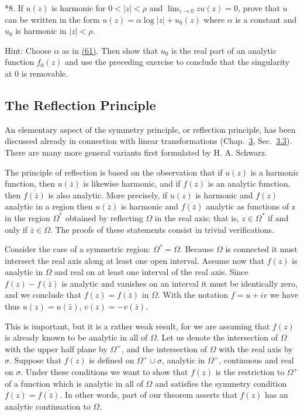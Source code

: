 *8. If $u(z)$ is harmonic for $0 < |z| < \rho$ and $\lim_{z \to 0} zu(z) = 0$, prove that $u$ can be written in the form $u(z) = \alpha \log |z| + u_0(z)$ where $\alpha$ is a constant and $u_0$ is harmonic in $|z| < \rho$.

Hint: Choose $\alpha$ as in \hyperref[eq:4.61]{(61)}. Then show that $u_{0}$ is the real part of an analytic function $f_{0}(z)$ and use the preceding exercise to conclude that the singularity at 0 is removable.

\setcounter{section}{6}\setcounter{subsection}{4}\subsection{The Reflection Principle}\label{sec:4.6.5}
An elementary aspect of the symmetry principle, or reflection principle, has been discussed already in connection with linear transformations (Chap.~\hyperref[chap:3]{3}, Sec.~\hyperref[sec:3.3.3]{3.3}). There are many more general variants first formulated by H. A. Schwarz.

The principle of reflection is based on the observation that if $u(z)$ is a harmonic function, then $u(\bar{z})$ is likewise harmonic, and if $f(z)$ is an analytic function, then $\overline{f(\bar{z})}$ is also analytic. More precisely, if $u(z)$ is harmonic and $f(z)$ analytic in a region then $u(\bar{z})$ is harmonic and $\overline{f(\bar{z})}$ analytic as functions of z in the region $\Omega^{*}$ obtained by reflecting $\Omega$ in the real axis; that is, $z \in \Omega^{*}$ if and only if $\bar{z} \in \Omega$. The proofs of these statements consist in trivial verifications.

Consider the case of a symmetric region: $\Omega^{*} = \Omega$. Because $\Omega$ is connected it must intersect the real axis along at least one open interval. Assume now that $f(z)$ is analytic in $\Omega$ and real on at least one interval of the real axis. Since $f(z) - \overline{f(\bar{z})}$ is analytic and vanishes on an interval it must be identically zero, and we conclude that $f(z) = \overline{f(\bar{z})}$ in $\Omega$. With the notation $f = u + iv$ we have thus $u(z) = u(\bar{z})$, $v(z) = -v(\bar{z})$.

This is important, but it is a rather weak result, for we are assuming that $f(z)$ is already known to be analytic in all of $\Omega$. Let us denote the intersection of $\Omega$ with the upper half plane by $\Omega^{+}$, and the intersection of $\Omega$ with the real axis by $\sigma$. Suppose that $f(z)$ is defined on $\Omega^{+} \cup \sigma$, analytic in $\Omega^{+}$, continuous and real on $\sigma$. Under these conditions we want to show that $f(z)$ is the restriction to $\Omega^{+}$ of a function which is analytic in all of $\Omega$ and satisfies the symmetry condition $f(z) = \overline{f(\bar{z})}$. In other words, part of our theorem asserts that $f(z)$ has an analytic continuation to $\Omega$.

